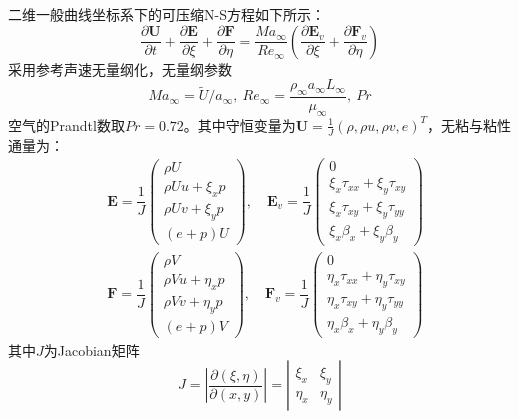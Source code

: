 \documentclass[11pt]{article}
\begin{document}
二维一般曲线坐标系下的可压缩N-S方程如下所示：
\begin{equation}
	\frac{\partial \bm{U}}{\partial t}+\frac{\partial \bm{E}}{\partial \xi}+\frac{\partial \bm{F}}{\partial \eta}=\frac{Ma_\infty}{Re_\infty}\left(\frac{\partial \bm{E}_v}{\partial \xi}+\frac{\partial \bm{F}_v}{\partial \eta}\right)
\end{equation}
采用参考声速无量纲化\citep{ccye_gpu_2020}，无量纲参数
\begin{equation}
	Ma_\infty=\tilde{U}/a_\infty,\ Re_\infty=\frac{\rho_\infty a_\infty L_\infty}{\mu_\infty},\ Pr
\end{equation}
空气的Prandtl数取$Pr=0.72$。其中守恒变量为$\bm{U}=\frac{1}{J}\left(\rho, \rho u, \rho v, e\right)^T$，无粘与粘性通量为：
\begin{align}
	 & \bm{E}=\dfrac{1}{J}\left(\begin{matrix}
			\rho U          \\
			\rho Uu+\xi_x p \\
			\rho Uv+\xi_y p \\
			(e+p)U
		\end{matrix}\right),\quad
	\bm{E}_v=\dfrac{1}{J}\left(\begin{matrix}
			0                             \\
			\xi_x\tau_{xx}+\xi_y\tau_{xy} \\
			\xi_x\tau_{xy}+\xi_y\tau_{yy} \\
			\xi_x\beta_{x}+\xi_y\beta_{y}
		\end{matrix}\right)        \\
	 & \bm{F}=\dfrac{1}{J}\left(\begin{matrix}
			\rho V           \\
			\rho Vu+\eta_x p \\
			\rho Vv+\eta_y p \\
			(e+p)V
		\end{matrix}\right),\quad
	\bm{F}_v=\dfrac{1}{J}\left(\begin{matrix}
			0                               \\
			\eta_x\tau_{xx}+\eta_y\tau_{xy} \\
			\eta_x\tau_{xy}+\eta_y\tau_{yy} \\
			\eta_x\beta_{x}+\eta_y\beta_{y}
		\end{matrix}\right)
\end{align}
其中$J$为Jacobian矩阵
\begin{equation}
	J=\left|\frac{\partial(\xi,\eta)}{\partial(x,y)}\right|=
	\left|\begin{matrix}
		\xi_x  & \xi_y  \\
		\eta_x & \eta_y
	\end{matrix}\right|
\end{equation}
\end{document}
